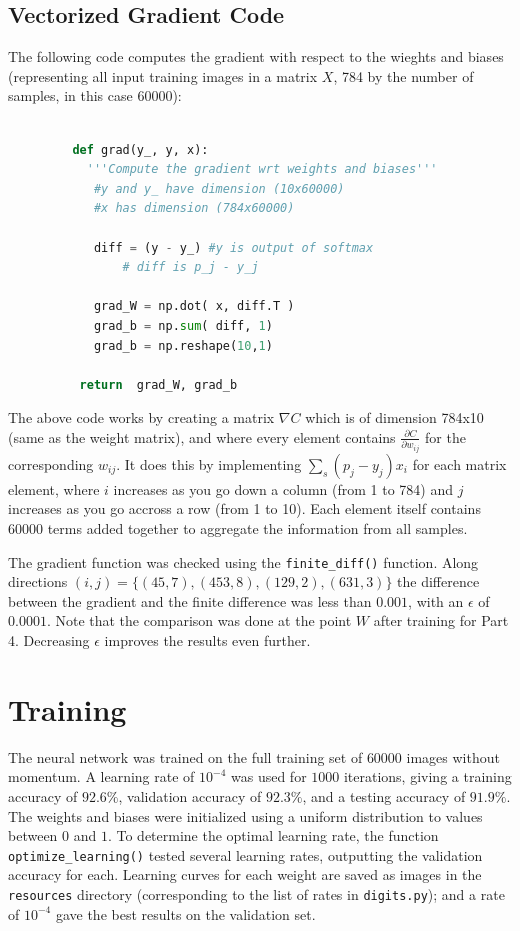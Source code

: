 \documentclass{article}
\begin{document}
   \subsection{Vectorized Gradient Code}
   The following code computes the gradient with respect to the wieghts and biases
   (representing all input training images in a matrix $X$, 784 by the number of samples, in this case 60000):
      \begin{lstlisting}[language=Python]

         def grad(y_, y, x):
      	   '''Compute the gradient wrt weights and biases'''
          	#y and y_ have dimension (10x60000)
          	#x has dimension (784x60000)

          	diff = (y - y_) #y is output of softmax
              	# diff is p_j - y_j

          	grad_W = np.dot( x, diff.T )
          	grad_b = np.sum( diff, 1)
          	grad_b = np.reshape(10,1)

          return  grad_W, grad_b
      \end{lstlisting}

   The above code works by creating a matrix $\nabla C $ which is of dimension 784x10
   (same as the weight matrix), and where every element contains $\frac{ \partial C}{ \partial w_{ij} }$ for the corresponding $w_{ij}$.
   It does this by implementing $\sum_s ( p_j - y_j ) x_i$ for each matrix element, where $i$ increases as you go down
   a column (from 1 to 784) and $j$ increases as you go accross a row (from 1 to 10). Each element itself contains 60000
   terms added together to aggregate the information from all samples.

   The gradient function was checked using the \texttt{finite\_diff()} function. Along directions
   $(i, j) = \{ (45,7), (453,8), (129,2), (631,3)  \}$ the difference between the gradient and the finite difference was less than $0.001$,
   with an $\epsilon$ of $0.0001$. Note that the comparison was done at the point $W$ after training for
   Part 4. Decreasing $\epsilon$ improves the results even further.

   \section{Training}
   The neural network was trained on the full training set of $60000$ images without momentum.
   A learning rate of $10^{-4}$ was used for $1000$ iterations, giving a training accuracy of $92.6\%$,
   validation accuracy of $92.3\%$, and a testing accuracy of $91.9\%$.
   The weights and biases were initialized using a uniform distribution to values between $0$ and $1$.
   To determine the optimal learning rate, the function \texttt{optimize\_learning()} tested several
   learning rates, outputting the validation accuracy for each. Learning curves for each weight
   are saved as images in the \texttt{resources} directory (corresponding to the list of
   rates in \texttt{digits.py}); and a rate of $10^{-4}$ gave the best
   results on the validation set.
\end{document}
